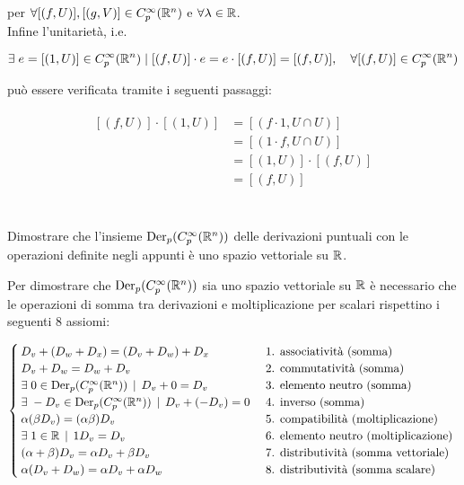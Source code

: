 per $ \forall [(f,U)], [(g,V)] \in C_{p}^{\infty}(\mathbb{R}^{n}) $ e $ \forall \lambda \in \mathbb{R} $.\\
Infine l'unitarietà, i.e.

\begin{equation}
	\E e = [(1,U)] \in C_{p}^{\infty}(\R^{n}) \mid [(f,U)] \cdot e = e \cdot [(f,U)] = [(f,U)] \qcomma \forall [(f,U)] \in C_{p}^{\infty}(\R^{n})
\end{equation}

può essere verificata tramite i seguenti passaggi:

\begin{align}
	\begin{split}
		[(f,U)] \cdot [(1,U)] &= [(f \cdot 1,U \cap U)]\\
		&= [(1 \cdot f,U \cap U)]\\
		&= [(1,U)] \cdot [(f,U)]\\
		&= [(f,U)]
	\end{split}
\end{align}

\tocless\section{}\label{es1-8}

\begin{tcolorbox}
	Dimostrare che l'insieme $ \operatorname{Der}_{p}(C_{p}^{\infty}(\mathbb{R}^{n})) $ delle derivazioni puntuali con le operazioni definite negli appunti è uno spazio vettoriale su $ \mathbb{R} $.
\end{tcolorbox}

Per dimostrare che $ \operatorname{Der}_{p}(C_{p}^{\infty}(\mathbb{R}^{n})) $ sia uno spazio vettoriale su $ \mathbb{R} $ è necessario che le operazioni di somma tra derivazioni e moltiplicazione per scalari rispettino i seguenti 8 assiomi:

\begin{equation}
	\begin{cases}
		D_{v} + (D_{w} + D_{x}) = (D_{v} + D_{w}) + D_{x} & \text{ 1. associatività (somma) }\\
		D_{v} + D_{w} = D_{w} + D_{v} & \text{ 2. commutatività (somma) }\\
		\exists \; 0 \in \operatorname{Der}_{p}(C_{p}^{\infty}(\mathbb{R}^{n})) \, \mid \, D_{v} + 0 = D_{v} & \text{ 3. elemento neutro (somma) }\\
		\exists \; - D_{v} \in \operatorname{Der}_{p}(C_{p}^{\infty}(\mathbb{R}^{n})) \, \mid \, D_{v} + (- D_{v}) = 0 & \text{ 4. inverso (somma) }\\
		\alpha (\beta D_{v}) = (\alpha \beta) D_{v} & \text{ 5. compatibilità (moltiplicazione) }\\
		\exists \; 1 \in \mathbb{R} \, \mid \, 1 D_{v} = D_{v} & \text{ 6. elemento neutro (moltiplicazione) }\\
		(\alpha + \beta) D_{v} = \alpha D_{v} + \beta D_{v} & \text{ 7. distributività (somma vettoriale) }\\
		\alpha (D_{v} + D_{w}) = \alpha D_{v} + \alpha D_{w} & \text{ 8. distributività (somma scalare) }
	\end{cases}
\end{equation}

